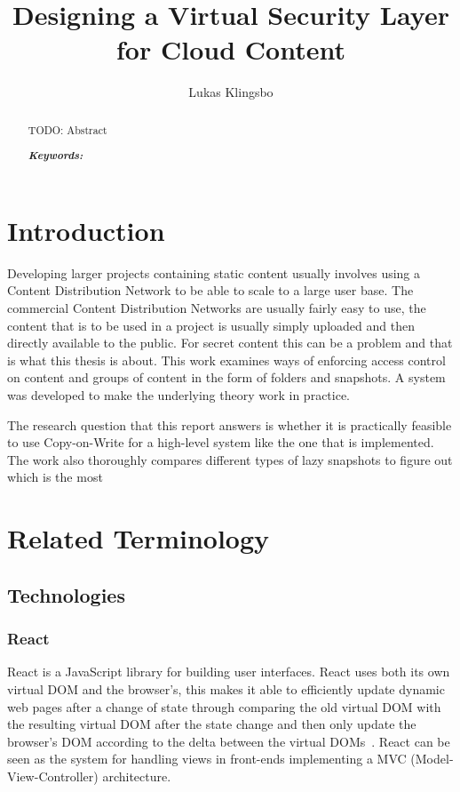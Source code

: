 \documentclass[a4paper,12pt]{article}
\title{\textbf{Designing a Virtual Security Layer for Cloud Content}}
\author{Lukas Klingsbo}
\providecommand{\keywords}[1]{\textbf{\textit{Keywords: }} #1}
\begin{document}
\maketitle
%

\setcounter{page}{2}

%
\begin{abstract}
    TODO: Abstract

\keywords{}
\end{abstract}

\newpage\null\thispagestyle{empty}\newpage

\setcounter{tocdepth}{3}
\tableofcontents

\clearpage
{}
\setcounter{page}{1}
\section{Introduction}
Developing larger projects containing static content usually involves using a Content Distribution Network 
to be able to scale to a large user base. The commercial Content Distribution Networks are usually fairly easy to use, 
the content that is to be used in a project is usually simply uploaded and then directly available to the public. 
For secret content this can be a problem and that is what this thesis is about. This work examines ways of enforcing 
access control on content and groups of content in the form of folders and snapshots. A system was developed to make 
the underlying theory work in practice. 

The research question that this report answers is whether it is practically feasible to use Copy-on-Write 
for a high-level system like the one that is implemented. The work also thoroughly compares different types of lazy 
snapshots to figure out which is the most

\newpage
\section{Related Terminology}
\subsection{Technologies}
\subsubsection{React}
React is a JavaScript library for building user interfaces. React uses both its own virtual DOM and the browser's, 
this makes it able to efficiently update dynamic web pages after a change of state through comparing the old virtual 
DOM with the resulting virtual DOM after the state change and then only update the browser's DOM according to the 
delta between the virtual DOMs~\cite{REACT}. React can be seen as the system for handling views in front-ends 
implementing a MVC (Model-View-Controller) architecture.
\end{document}
